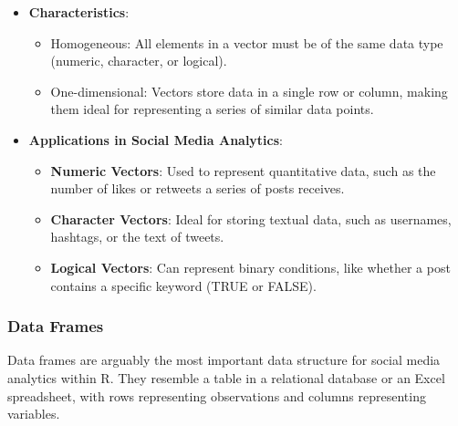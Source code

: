 \documentclass[
]{book}
\providecommand{\tightlist}{%
  \setlength{\itemsep}{0pt}\setlength{\parskip}{0pt}}
\begin{document}
\begin{itemize}
\tightlist
\item
  \textbf{Characteristics}:

  \begin{itemize}
  \tightlist
  \item
    Homogeneous: All elements in a vector must be of the same data type (numeric, character, or logical).
  \item
    One-dimensional: Vectors store data in a single row or column, making them ideal for representing a series of similar data points.
  \end{itemize}
\item
  \textbf{Applications in Social Media Analytics}:

  \begin{itemize}
  \tightlist
  \item
    \textbf{Numeric Vectors}: Used to represent quantitative data, such as the number of likes or retweets a series of posts receives.
  \item
    \textbf{Character Vectors}: Ideal for storing textual data, such as usernames, hashtags, or the text of tweets.
  \item
    \textbf{Logical Vectors}: Can represent binary conditions, like whether a post contains a specific keyword (TRUE or FALSE).
  \end{itemize}
\end{itemize}

\hypertarget{data-frames-1}{%
\subsubsection{Data Frames}\label{data-frames-1}}

Data frames are arguably the most important data structure for social media analytics within R. They resemble a table in a relational database or an Excel spreadsheet, with rows representing observations and columns representing variables.
\end{document}
